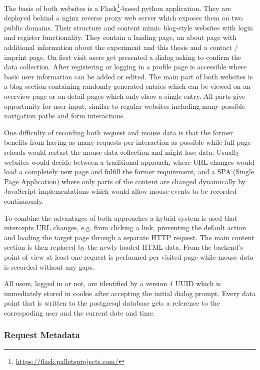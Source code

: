 \documentclass[
    fontsize=12pt,
    headings=small,
    parskip=half,           %
    bibliography=totoc,
    numbers=noenddot,       %
    open=any,               %
    final                   %
]{scrreprt}
\begin{document}
The basis of both websites is a Flask\footnote{\url{https://flask.palletsprojects.com/}}-based python application. They are deployed behind a nginx reverse proxy web server which exposes them on two public domains. Their structure and content mimic blog-style websites with login and register functionality. They contain a landing page, an about page with additional information about the experiment and this thesis and a contact / imprint page.
On first visit users get presented a dialog asking to confirm the data collection.
After registering or logging in a profile page is accessible where basic user information can be added or edited. The main part of both websites is a blog section containing randomly generated entries which can be viewed on an overview page or on detail pages which only show a single entry.
All parts give opportunity for user input, similar to regular websites including many possible navigation paths and form interactions.

One difficulty of recording both request and mouse data is that the former benefits from having as many requests per interaction as possible while full page reloads would restart the mouse data collection and might lose data. Usually websites would decide between a traditional approach, where URL changes would load a completely new page and fulfill the former requirement, and a SPA (Single Page Application) where only parts of the content are changed dynamically by JavaScript implementations which would allow mouse events to be recorded continuously.

To combine the advantages of both approaches a hybrid system is used that intercepts URL changes, e.g. from clicking a link, preventing the default action and loading the target page through a separate HTTP request. The main content section is then replaced by the newly loaded HTML data. From the backend's point of view at least one request is performed per visited page while mouse data is recorded without any gaps.

All users, logged in or not, are identified by a version 4 UUID which is immediately stored in cookie after accepting the initial dialog prompt. Every data point that is written to the postgresql database gets a reference to the correspoding user and the current date and time.

\subsubsection{Request Metadata}
\end{document}

